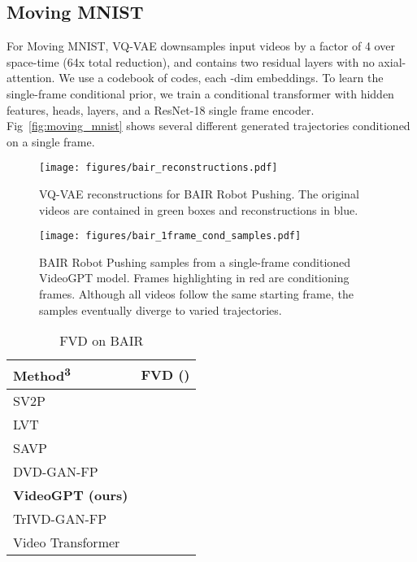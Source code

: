 \documentclass{article}
\begin{document}
\subsection{Moving MNIST}
For Moving MNIST, VQ-VAE downsamples input videos by a factor of 4 over space-time (64x total reduction), and contains two residual layers with no axial-attention. We use a codebook of  codes, each -dim embeddings. To learn the single-frame conditional prior, we train a conditional transformer with  hidden features,  heads,  layers, and a ResNet-18 single frame encoder. Fig~\ref{fig:moving_mnist} shows several different generated trajectories conditioned on a single frame.

\begin{figure*}[h]
    \centering
    \texttt{[image: figures/bair\_reconstructions.pdf]}
    \caption{VQ-VAE reconstructions for BAIR Robot Pushing. The original videos are contained in green boxes and reconstructions in blue. }
    \label{fig:bair_recon}
\end{figure*}
\begin{figure*}[h]
    \centering
    \texttt{[image: figures/bair\_1frame\_cond\_samples.pdf]}
    \caption{BAIR Robot Pushing samples from a single-frame conditioned VideoGPT model. Frames highlighting in red are conditioning frames. Although all videos follow the same starting frame, the samples eventually diverge to varied trajectories.}
    \label{fig:bair_pushing}

\end{figure*}

\begin{table}[h]
    
        \centering
    
        \caption{FVD on BAIR}
        \label{table:bair_fvd}
        \begin{tabular}{ll}
            \toprule
            Method\textsuperscript{3}                   & FVD ()                \\ \midrule
            SV2P                    &             \\
            LVT                     &            \\
            SAVP                    &             \\
            DVD-GAN-FP              &             \\
            \textbf{VideoGPT (ours)}          &             \\
            TrIVD-GAN-FP           &              \\
            Video Transformer        &  \\ \bottomrule
        \end{tabular}
\end{table}
\end{document}
